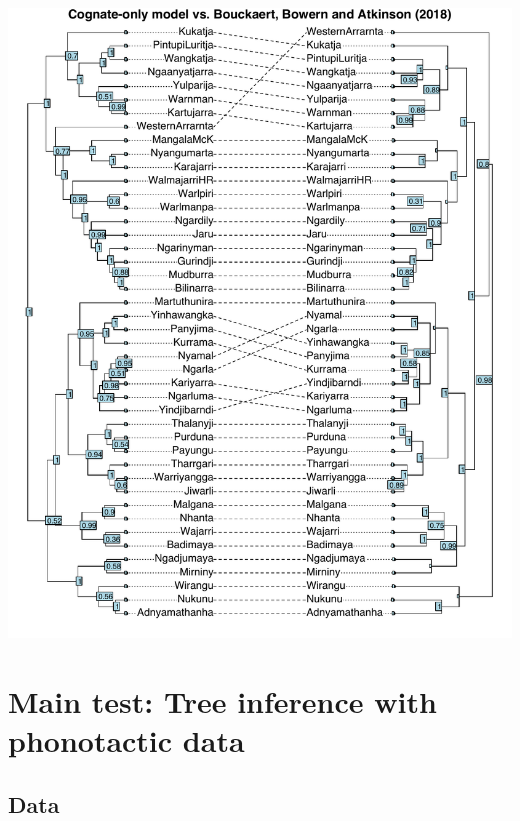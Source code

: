 \documentclass[]{article}
\begin{document}
\includegraphics{fig/cogs_vs_bba2018.pdf}

\hypertarget{main-test-tree-inference-with-phonotactic-data}{%
\section{Main test: Tree inference with phonotactic data}\label{main-test-tree-inference-with-phonotactic-data}}

\hypertarget{data}{%
\subsection{Data}\label{data}}
\end{document}
